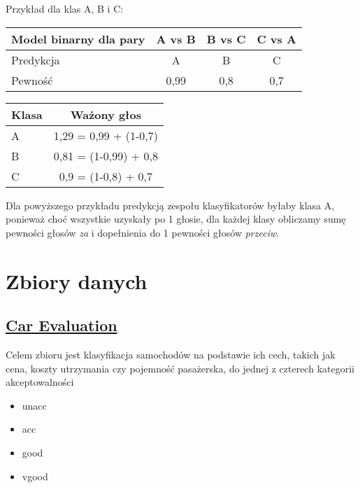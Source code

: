 \documentclass{article}
\begin{document}
Przykład dla klas A, B i C:

\begin{table}[ht]
\centering
\begin{tabular}{|l|c|c|c|}
\hline
Model binarny dla pary & A vs B & B vs C & C vs A \\ \hline
Predykcja              & A      & B      & C      \\
Pewność                & 0,99   & 0,8    & 0,7    \\ \hline
\end{tabular}
\label{tab:binary-pairs}
\end{table}

\begin{table}[ht]
\centering
\begin{tabular}{|l|c|}
\hline
Klasa & Ważony głos \\ \hline
A     & 1,29 = 0,99 + (1-0,7) \\
B     & 0,81 = (1-0,99) + 0,8 \\
C     & 0,9 = (1-0,8) + 0,7 \\ \hline
\end{tabular}
\label{tab:weighted-votes}
\end{table}

Dla powyższego przykładu predykcją zespołu klasyfikatorów byłaby klasa A, ponieważ choć wszystkie uzyskały po 1 głosie,
dla każdej klasy obliczamy sumę pewności głosów \textit{za} i dopełnienia do 1 pewności głosów \textit{przeciw}.

\section{Zbiory danych}


\subsection{\href{https://archive.ics.uci.edu/dataset/19/car+evaluation}{Car Evaluation}}



Celem zbioru jest klasyfikacja samochodów na podstawie ich cech, takich jak cena, koszty utrzymania czy pojemność pasażerska, do jednej z czterech kategorii akceptowalności

\begin{itemize}
    \item unacc
    \item acc
    \item good
    \item vgood
\end{itemize}
\end{document}
